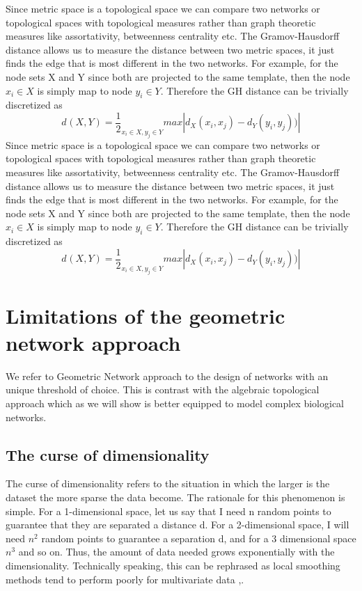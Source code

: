 \documentclass[onecollarge,runningheads]{svjour2}
\begin{document}
Since metric space is a topological space we can compare two networks or topological spaces with topological measures rather than graph theoretic measures like assortativity, betweenness centrality etc.
The Gramov-Hausdorff distance allows us to measure the distance between two metric spaces, it just finds the edge that is most different in the two networks. For example, for the node sets X and Y since both are projected to the same template, then the node $x_i \in X$ is simply map to node $y_i \in Y$. Therefore the GH distance can be trivially discretized as 
\begin{equation}
d_{}(X,Y) = \frac{1}{2}_{x_i \in X, y_j \in Y} max |d_X(x_i,x_j) - d_Y(y_i,y_j))|
\end{equation} 
Since metric space is a topological space we can compare two networks or topological spaces with topological measures rather than graph theoretic measures like assortativity, betweenness centrality etc.
The Gramov-Hausdorff distance allows us to measure the distance between two metric spaces, it just finds the edge that is most different in the two networks. For example, for the node sets X and Y since both are projected to the same template, then the node $x_i \in X$ is simply map to node $y_i \in Y$. Therefore the GH distance can be trivially discretized as 
\begin{equation}
d_{}(X,Y) = \frac{1}{2}_{x_i \in X, y_j \in Y} max |d_X(x_i,x_j) - d_Y(y_i,y_j))|
\end{equation} 

\section{Limitations of the geometric network approach}
\label{se:s2}
We refer to Geometric Network approach to the design of networks with an unique threshold of choice. This is contrast with the algebraic topological approach which as we will show is better equipped to model complex biological networks. 

\subsection{The curse of dimensionality}
The curse of dimensionality refers to the situation in which the larger is the dataset the more sparse the data become. The rationale for this phenomenon is simple. For a 1-dimensional space, let us say that I need n random points to guarantee that they are separated a distance d. For a 2-dimensional space, I will need $n^2$ random points to guarantee a separation d, and for a 3 dimensional space $n^3$ and so on. Thus, the amount of data needed grows exponentially with the dimensionality. Technically speaking, this can be rephrased as local smoothing methods tend to perform poorly for multivariate data \cite{stone1982optimal},\cite{lavergne2008breaking}.  
\end{document}
